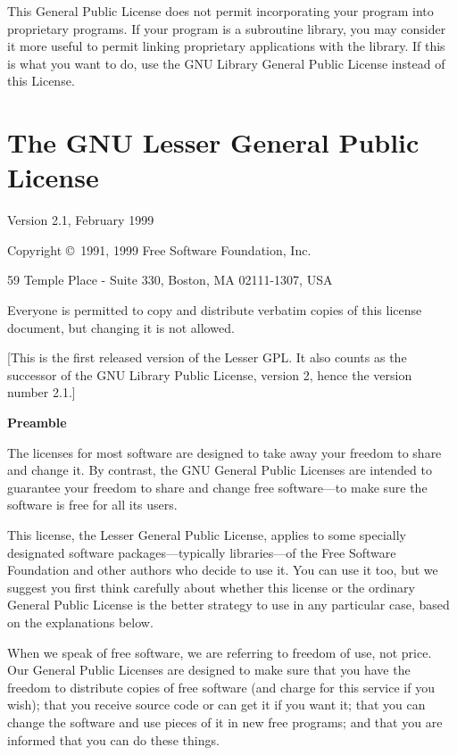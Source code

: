 \documentclass[12pt]{report}
\begin{document}
This General Public License does not permit incorporating your program
into proprietary programs.  If your program is a subroutine library, you
may consider it more useful to permit linking proprietary applications
with the library.  If this is what you want to do, use the GNU Library
General Public License instead of this License.


\chapter{The GNU Lesser General Public License}

\begin{center}
{\parindent 0in

Version 2.1, February 1999

Copyright \copyright\ 1991, 1999 Free Software Foundation, Inc.

\bigskip

59 Temple Place - Suite 330, Boston, MA  02111-1307, USA

\bigskip

Everyone is permitted to copy and distribute verbatim copies
of this license document, but changing it is not allowed.

\bigskip

[This is the first released version of the Lesser GPL.  It also counts
 as the successor of the GNU Library Public License, version 2, hence
 the version number 2.1.]
}

\end{center}

\begin{center}
{\bf\large Preamble}
\end{center}

The licenses for most software are designed to take away your freedom to
share and change it.  By contrast, the GNU General Public Licenses are
intended to guarantee your freedom to share and change free software---to
make sure the software is free for all its users.

This license, the Lesser General Public License, applies to some specially
designated software packages---typically libraries---of the Free Software
Foundation and other authors who decide to use it.  You can use it too,
but we suggest you first think carefully about whether this license or the
ordinary General Public License is the better strategy to use in any
particular case, based on the explanations below.

When we speak of free software, we are referring to freedom of use, not
price.  Our General Public Licenses are designed to make sure that you
have the freedom to distribute copies of free software (and charge for
this service if you wish); that you receive source code or can get it if
you want it; that you can change the software and use pieces of it in new
free programs; and that you are informed that you can do these things.
\end{document}
